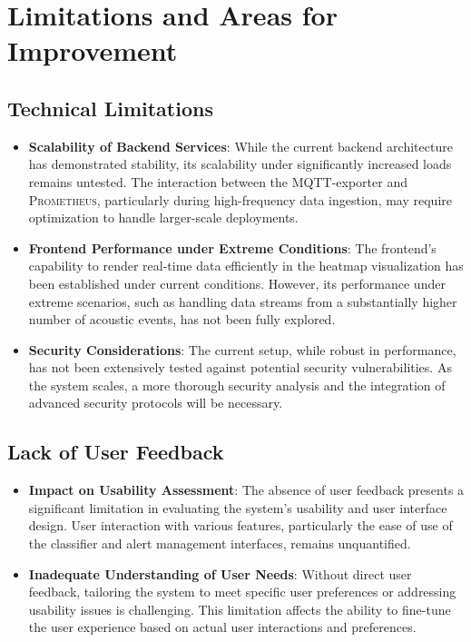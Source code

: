 \section{Limitations and Areas for Improvement}
\subsection{Technical Limitations}
\begin{itemize}
  \item \textbf{Scalability of Backend Services}: While the current backend architecture has demonstrated stability, its scalability under significantly increased loads remains untested. The interaction between the MQTT-exporter and \textsc{Prometheus}, particularly during high-frequency data ingestion, may require optimization to handle larger-scale deployments.
  \item \textbf{Frontend Performance under Extreme Conditions}: The frontend's capability to render real-time data efficiently in the heatmap visualization has been established under current conditions. However, its performance under extreme scenarios, such as handling data streams from a substantially higher number of acoustic events, has not been fully explored.
  \item \textbf{Security Considerations}: The current setup, while robust in performance, has not been extensively tested against potential security vulnerabilities. As the system scales, a more thorough security analysis and the integration of advanced security protocols will be necessary.
\end{itemize}

\subsection{Lack of User Feedback}
\begin{itemize}
  \item \textbf{Impact on Usability Assessment}: The absence of user feedback presents a significant limitation in evaluating the system's usability and user interface design. User interaction with various features, particularly the ease of use of the classifier and alert management interfaces, remains unquantified.
  \item \textbf{Inadequate Understanding of User Needs}: Without direct user feedback, tailoring the system to meet specific user preferences or addressing usability issues is challenging. This limitation affects the ability to fine-tune the user experience based on actual user interactions and preferences.
\end{itemize}


